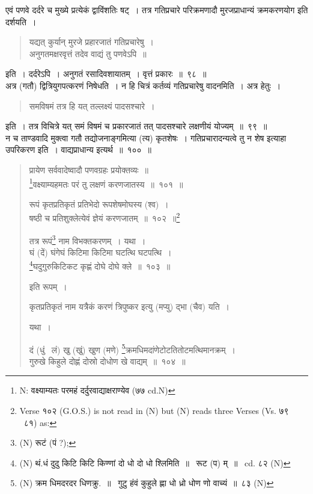 \documentclass[11pt, openany]{book}
\begin{document}
एवं पणवे दर्दरे च मुख्ये प्रत्येकं द्वाविंशतिः षट्~। तत्र गतिप्रचारे परिक्रमणादौ मुरजप्राधान्यं क्रमकरणयोग इति दर्शयति~। 

\begin{quote}
{\qt यद्यत् कुर्यान् मुरजे प्रहारजातं गतिप्रचारेषु~।\\
 अनुगतमक्षरवृत्तं तदेव वाद्यं तु पणवेऽपि~॥}
\end{quote}
 
\noindent
इति~। {\qtt दर्दरेऽपि}~। अनुगतं रसादिवशायातम्~। वृत्तं प्रकारः~॥~९८~॥\\

अत्र (गतौ) द्वित्रियुगपत्करणं निषेधति~। न हि चित्रं कर्तव्यं गतिप्रचारेषु वादनमिति~। अत्र हेतुः~।

\begin{quote}
{\qt समविषमं तत्र हि यत् तल्लक्ष्यं पादसश्चारे~।}
\end{quote}

\noindent
इति~। तत्र विचित्रे यत् समं विषमं च प्रकारजातं तत् पादसश्चारे लक्षणीयं योज्यम्~॥~९९~॥\\

न च ताण्डवादि मुक्त्वा गतौ तद्योजनाङ्गमित्या (त्य) कृतशेषः~। गतिप्रचारादन्यत्वे तु न शेष इत्याहा उपरिकरण इति~। वाद्यप्राधान्य इत्यर्थ~॥~१००~॥

\newpage

\begin{quote}
{\na प्रायेण सर्ववादेष्वादौ पणवग्रहः प्रयोक्तव्यः~॥\\
\renewcommand{\thefootnote}{1}\footnote{N: वक्ष्याम्यतः परमहं दर्दुरवाद्याक्षराण्येव (७७ cd.N)}वक्ष्याम्यहमतः परं तु लक्षणं करणजातस्य~॥~१०१~॥

रूपं कृतप्रतिकृतं प्रतिभेदो रूपशेषमोघस्य (श्व)~।\\
षष्ठी च प्रतिशुक्लेत्येवं ज्ञेयं करणजातम्~॥~१०२~॥\renewcommand{\thefootnote}{2}\footnote{Verse १०२ (G.O.S.) is not read in (N) but  (N) reads three Verses (Vs. ७९ \textendash\ ८१) as:}

तत्र रूपं\renewcommand{\thefootnote}{3}\footnote{(N) रूटं (पं ?);} नाम विभक्तकरणम्~। यथा~।\\
घं (दें) घंगेघं किटिमा किटिमा घटत्थि घटपत्थि~।\\
\renewcommand{\thefootnote}{4}\footnote{(N) थं.धं दुदु किटि किटि किण्णां दो धो दो धो श्लिमिति~॥~ रूट (प) म्~॥~ cd. ८२ (N)}घदुगुरुकिटिकट कृह्णं दोघे दोघे क्ले~॥~१०३~॥}

इति रूपम्~। 

{\na कृतप्रतिकृतं नाम यत्रैकं करणं त्रिपुष्कर इत्यु (मप्यु) द्भा (चैव) यति~।}

यथा~। 

{\na दं (धुं \textendash\ लं) खु (खुं) खुण (मणे) \renewcommand{\thefootnote}{5}\footnote{(N) क्रम धिमदरदर धिणक्रु.~॥~ गुटु हंवं कुहुले ह्णा धो ध्रो धोण णो वाच्यं~॥~८३ (N)}क्रमधिमदांणेटोटतितोटमत्थिमानक्रम्~।\\
गुरुखे किहुले दोह्णं दोस्रो दोधोण खे वाद्यम्~॥~१०४~॥}
\end{quote}
\end{document}
